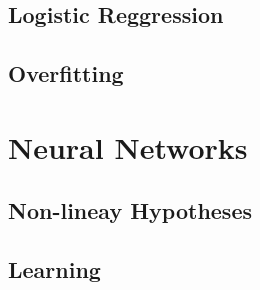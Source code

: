 \documentclass[en,11pt,english,black,simple,device=ppt]{elegantbook}
\begin{document}
\section{Logistic Reggression}



\section{Overfitting}



\chapter{Neural Networks}

\section{Non-lineay Hypotheses}



\section{Learning}


\end{document}
